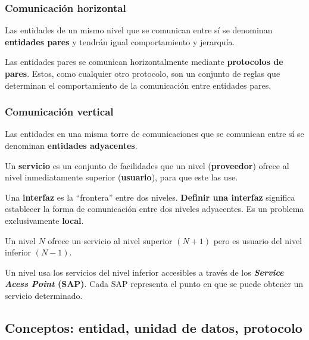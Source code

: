 \documentclass[a4paper]{book}
\begin{document}
\begin{multicols}{2}
  \subsubsection{Comunicación horizontal}
  Las entidades de un mismo nivel que se comunican entre sí se denominan \textbf{entidades pares} y tendrán igual comportamiento y jerarquía.

  Las entidades pares se comunican horizontalmente mediante \textbf{protocolos de pares}. Estos, como cualquier otro protocolo, son un conjunto de reglas que determinan el comportamiento de la comunicación entre entidades pares.
  \columnbreak
  \subsubsection{Comunicación vertical}
  Las entidades en una misma torre de comunicaciones que se comunican entre sí se denominan \textbf{entidades adyacentes}.

  Un \textbf{servicio} es un conjunto de facilidades que un nivel (\textbf{proveedor}) ofrece al nivel inmediatamente superior (\textbf{usuario}), para que este las use.

  Una \textbf{interfaz} es la ``frontera'' entre dos niveles. \textbf{Definir una interfaz} significa establecer la forma de comunicación entre dos niveles adyacentes. Es un problema exclusivamente \textbf{local}.

  Un nivel $N$ ofrece un servicio al nivel superior $(N+1)$ pero es usuario del nivel inferior $(N-1)$.

  Un nivel usa los servicios del nivel inferior accesibles a través de los \textbf{\textsl{Service Acess Point} (SAP)}. Cada SAP representa el punto en que se puede obtener un servicio determinado.
\end{multicols}

\subsection{Conceptos: entidad, unidad de datos, protocolo}
\end{document}
